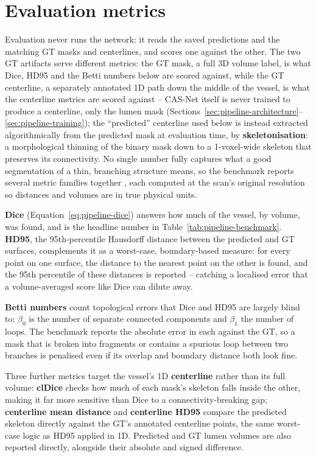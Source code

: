 
\section{Evaluation metrics}
\label{sec:pipeline-metrics}

Evaluation never runs the network: it reads the saved predictions and the matching GT masks and
centerlines, and scores one against the other. The two GT artifacts serve different metrics: the
GT mask, a full 3D volume label, is what Dice, HD95 and the Betti numbers below are scored
against, while the GT centerline, a separately annotated 1D path down the middle of the vessel, is
what the centerline metrics are scored against -- CAS-Net itself is never trained to produce a
centerline, only the lumen mask (Sections~\ref{sec:pipeline-architecture}--
\ref{sec:pipeline-training}); the ``predicted'' centerline used below is instead extracted
algorithmically from the predicted mask at evaluation time, by \textbf{skeletonisation}: a
morphological thinning of the binary mask down to a 1-voxel-wide skeleton that preserves its
connectivity. No single number fully captures what a
good segmentation of a thin, branching structure means, so the benchmark reports several metric
families together \cite{taha2015metrics}, each computed at the scan's original resolution so
distances and volumes are in true physical units.

\textbf{Dice} (Equation~\ref{eq:pipeline-dice}) answers how much of the vessel, by volume, was
found, and is the headline number in Table~\ref{tab:pipeline-benchmark}. \textbf{HD95}, the
95th-percentile Hausdorff distance between the predicted and GT surfaces, complements it as a
worst-case, boundary-based measure: for every point on one surface, the distance to the nearest
point on the other is found, and the 95th percentile of these distances is reported -- catching a
localised error that a volume-averaged score like Dice can dilute away.

\textbf{Betti numbers} count topological errors that Dice and HD95 are largely blind to: $\beta_0$
is the number of separate connected components and $\beta_1$ the number of loops. The benchmark
reports the absolute error in each against the GT, so a mask that is broken into fragments or
contains a spurious loop between two branches is penalised even if its overlap and boundary
distance both look fine.

Three further metrics target the vessel's 1D \textbf{centerline} rather than its full volume:
\textbf{clDice} \cite{shit2021cldice} checks how much of each mask's skeleton falls inside the
other, making it far more sensitive than Dice to a connectivity-breaking gap; \textbf{centerline
mean distance} and \textbf{centerline HD95} compare the predicted skeleton directly against the
GT's annotated centerline points, the same worst-case logic as HD95 applied in 1D. Predicted and
GT lumen volumes are also reported directly, alongside their absolute and signed difference.

